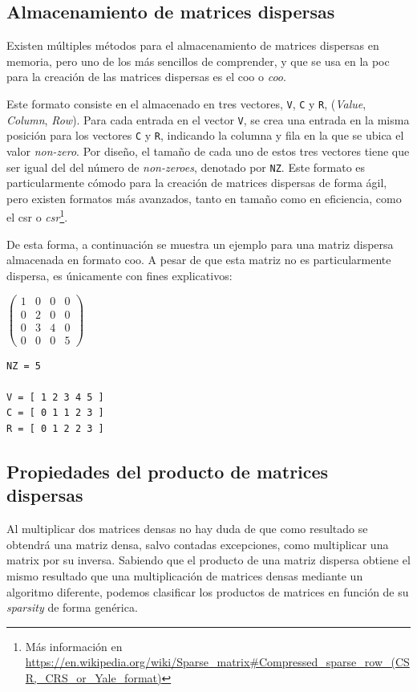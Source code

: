\subsection{Almacenamiento de matrices dispersas}
\label{ssec:almacenamiento_matrices_dispersas}
Existen múltiples métodos para el almacenamiento de matrices dispersas en memoria, pero uno de los más sencillos de comprender, y que se usa en la \acrshort{poc} para la creación de las matrices dispersas es el \acrshort{coo} o \textit{\acrlong{coo}}.

Este formato consiste en el almacenado en tres vectores, \texttt{V}, \texttt{C} y \texttt{R}, (\textit{Value}, \textit{Column}, \textit{Row}). Para cada entrada en el vector \texttt{V}, se crea una entrada en la misma posición para los vectores \texttt{C} y \texttt{R}, indicando la columna y fila en la que se ubica el valor \textit{non-zero}. Por diseño, el tamaño de cada uno de estos tres vectores tiene que ser igual del del número de \textit{non-zeroes}, denotado por \texttt{NZ}. Este formato es particularmente cómodo para la creación de matrices dispersas de forma ágil, pero existen formatos más avanzados, tanto en tamaño como en eficiencia, como el \acrshort{csr} o \textit{\acrlong{csr}}\footnote{Más información en \url{https://en.wikipedia.org/wiki/Sparse_matrix\#Compressed_sparse_row_(CSR,\_CRS\_or\_Yale\_format)}}.

De esta forma, a continuación se muestra un ejemplo para una matriz dispersa almacenada en formato \acrshort{coo}. A pesar de que esta matriz no es particularmente dispersa, es únicamente con fines explicativos:

\begin{center}
    $\begin{pmatrix}
        1 & 0 & 0 & 0\\
        0 & 2 & 0 & 0\\
        0 & 3 & 4 & 0\\
        0 & 0 & 0 & 5
    \end{pmatrix}$
    \vspace*{0.5cm}
\begin{lstlisting}[]
NZ = 5

V = [ 1 2 3 4 5 ]
C = [ 0 1 1 2 3 ]
R = [ 0 1 2 2 3 ]
\end{lstlisting}
\end{center}

\subsection{Propiedades del producto de matrices dispersas}
\label{ssec:propiedades_producto_matrices_dispersas}
Al multiplicar dos matrices densas no hay duda de que como resultado se obtendrá una matriz densa, salvo contadas excepciones, como multiplicar una matrix por su inversa. Sabiendo que el producto de una matriz dispersa obtiene el mismo resultado que una multiplicación de matrices densas mediante un algoritmo diferente, podemos clasificar los productos de matrices en función de su \textit{sparsity} de forma genérica.

